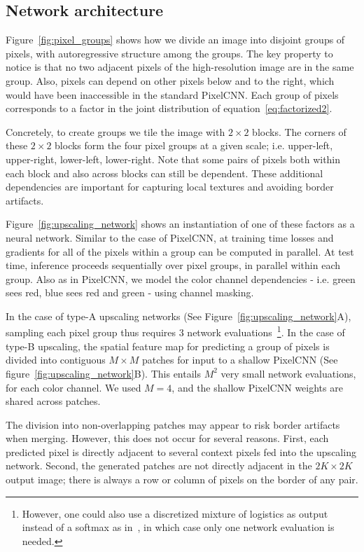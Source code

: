 \documentclass{article}
\begin{document}
\subsection{Network architecture}
Figure~\ref{fig:pixel_groups} shows how we divide an image into disjoint groups of pixels, with autoregressive structure among the groups.
The key property to notice is that no two adjacent pixels of the high-resolution image are in the same group.
Also, pixels can depend on other pixels below and to the right, which would have been inaccessible in the standard PixelCNN.
Each group of pixels corresponds to a factor in the joint distribution of equation~\ref{eq:factorized2}.






Concretely, to create groups we tile the image with $2 \times 2$ blocks.
The corners of these $2 \times 2$ blocks form the four pixel groups at a given scale; i.e. upper-left, upper-right, lower-left, lower-right.
Note that some pairs of pixels both within each block and also across blocks can still be dependent.
These additional dependencies are important for capturing local textures and avoiding border artifacts.

Figure~\ref{fig:upscaling_network} shows an instantiation of one of these factors as a neural network.
Similar to the case of PixelCNN, at training time losses and gradients for all of the pixels within a group can be computed in parallel.
At test time, inference proceeds sequentially over pixel groups, in parallel within each group.
Also as in PixelCNN, we model the color channel dependencies - i.e. green sees red, blue sees red and green - using channel masking.


In the case of type-A upscaling networks (See Figure~\ref{fig:upscaling_network}A), sampling each pixel group thus requires $3$ network evaluations~\footnote{However, one could also use a discretized mixture of logistics as output instead of a softmax as in~\citet{salimans2017pixelcnn}, in which case only one network evaluation is needed.}.
In the case of type-B upscaling, the spatial feature map for predicting a group of pixels is divided into contiguous $M \times M$ patches for input to a shallow PixelCNN (See figure~\ref{fig:upscaling_network}B).
This entails $M^2$ very small network evaluations, for each color channel.
We used $M=4$, and the shallow PixelCNN weights are shared across patches.


The division into non-overlapping patches may appear to risk border artifacts when merging.
However, this does not occur for several reasons.
First, each predicted pixel is directly adjacent to several context pixels fed into the upscaling network.
Second, the generated patches are not directly adjacent in the $2K \times 2K$ output image; there is always a row or column of pixels on the border of any pair.
\end{document}
